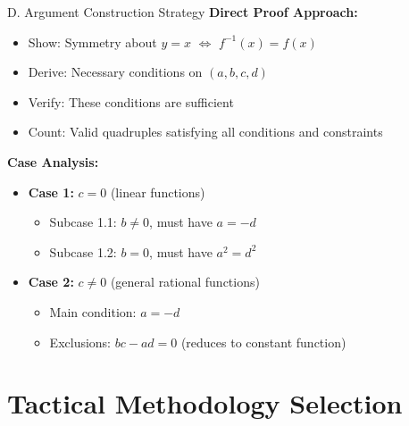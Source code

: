 \documentclass[12pt]{article}
\begin{document}
\begin{strategybox}{D. Argument Construction Strategy}
\textbf{Direct Proof Approach:}
\begin{itemize}
    \item Show: Symmetry about $y=x$ $\Leftrightarrow$ $f^{-1}(x) = f(x)$
    \item Derive: Necessary conditions on $(a,b,c,d)$
    \item Verify: These conditions are sufficient
    \item Count: Valid quadruples satisfying all conditions and constraints
\end{itemize}

\textbf{Case Analysis:}
\begin{itemize}
    \item \textbf{Case 1:} $c=0$ (linear functions)
    \begin{itemize}
        \item Subcase 1.1: $b \neq 0$, must have $a=-d$
        \item Subcase 1.2: $b=0$, must have $a^2 = d^2$
    \end{itemize}
    \item \textbf{Case 2:} $c \neq 0$ (general rational functions)
    \begin{itemize}
        \item Main condition: $a=-d$
        \item Exclusions: $bc-ad=0$ (reduces to constant function)
    \end{itemize}
\end{itemize}
\end{strategybox}

\section{Tactical Methodology Selection}
\end{document}
